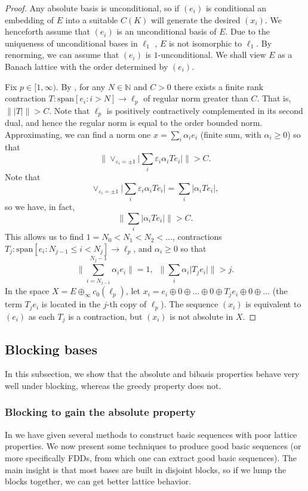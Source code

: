 \documentclass[12pt,leqno]{amsart}
\numberwithin{equation}{section}
\theoremstyle{definition}
\def\N{{\mathbb N}}
\newcommand{\spn}{\mathrm{span}}
\begin{document}
\begin{proof}
Any absolute basis is unconditional, so if $(e_i)$ is conditional an embedding of $E$ into a suitable $C(K)$ will generate the desired $(x_i)$. We henceforth assume that $(e_i)$ is an unconditional basis of $E$. Due to the uniqueness of  unconditional bases in $\ell_1$ \cite[Theorem 2.b.10]{LT1}, $E$ is not isomorphic to $\ell_1$.
By renorming, we can assume that $(e_i)$ is $1$-unconditional.
We shall view $E$ as a Banach lattice with the order determined by $(e_i)$.
\medskip

Fix $p \in [1,\infty)$. By \cite[Theorem 2.3]{Wickstead07}, for any $N \in \N$ and $C>0$ there exists a finite rank contraction $T : \spn[e_i : i > N] \to \ell_p$ of regular norm greater than $C$.  That is,
$\||T|\|>C $.
Note that $\ell_p$ is positively contractively complemented in its second dual, and hence the regular norm is equal to the order bounded norm.
Approximating, we can find a norm one $x = \sum_i \alpha_i e_i$ (finite sum, with $\alpha_i \geq 0$) so that
$$
\Big\| \vee_{\varepsilon_i = \pm 1} \big| \sum_i \varepsilon_i \alpha_i T e_i \big| \Big\| > C .
$$
Note that
$$
\vee_{\varepsilon_i = \pm 1} \big| \sum_i \varepsilon_i \alpha_i T e_i\big| = \sum_i \big| \alpha_i T e_i \big| ,
$$
so we have, in fact,
$$
\Big\| \sum_i \big| \alpha_i T e_i \big| \Big\| > C .
$$
This allows us to find $1 = N_0 < N_1 < N_2 < \ldots$, contractions $T_j : \spn[e_i : N_{j-1} \leq i < N_j] \to \ell_p$, and $\alpha_i \geq 0$ so that
$$
\big\|\sum_{i=N_{j-1}}^{N_j-1} \alpha_i e_i\big\| = 1 , \, \, \,
\Big\| \sum_i \alpha_i \big| T_j e_i \big| \Big\| > j .
$$
In the space $X = E \oplus_\infty c_0(\ell_p)$, let $x_i = e_i \oplus 0 \oplus \ldots \oplus 0 \oplus T_j e_i \oplus 0 \oplus \ldots$ (the term $T_j e_i$ is located in the $j$-th copy of $\ell_p$).
The sequence $(x_i)$ is equivalent to $(e_i)$ as each $T_j$ is a contraction, but $(x_i)$ is not absolute in $X$.
\end{proof}



\subsection{Blocking bases}\label{Section5}
In this subsection, we show that the absolute and bibasis properties behave very well under blocking, whereas the greedy property does not.
\subsubsection{Blocking to gain the absolute property}\label{section 5.1}
In  we have given several methods to construct basic sequences with poor lattice properties. We now present some techniques to produce good basic sequences (or more specifically FDDs, from which one can extract good basic sequences). The main insight is that most bases are built in disjoint blocks, so if we lump the blocks together, we can get better lattice behavior.
\end{document}
